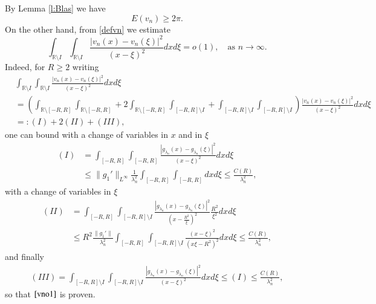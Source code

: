\documentclass[12pt, a4paper]{article}
\newcommand{\R}{\mathbb{R}}
\renewcommand{\(}{\left(}
\renewcommand{\)}{\right)}
\begin{document}
By Lemma \ref{l:Blas} we have
$$E(v_n)\ge 2\pi.$$
On the other hand, from \eqref{defvn} we estimate %
\begin{equation}\label{vno1}\int_{\R\setminus I}\int_{\R\setminus I}\frac{|v_n(x)-v_n(\xi)|^2}{(x-\xi)^2}dxd\xi=o(1),\quad \text{as }n\to\infty.
\end{equation} Indeed, for $R\geq 2$ writing \begin{align*}  & \int_{\R\setminus I}\int_{\R\setminus I}\frac{|v_n(x)-v_n(\xi)|^2}{(x-\xi)^2}dxd\xi\\&=\left(\int_{\R\setminus [-R,R]}\int_{\R\setminus [-R,R]}+2\int_{\R\setminus [-R,R]}\int_{[-R,R]\setminus I}+\int_{[-R,R]\setminus I}\int_{[-R,R]\setminus I}  \right)\frac{|v_n(x)-v_n(\xi)|^2}{(x-\xi)^2}dxd\xi\\&=:(I)+2(II)+(III),\end{align*} one can bound with a change of variables in $x$ and in $\xi$
\begin{align*}(I)&=\int_{[-R,R]}\int_{[-R,R]} \frac{|g_{\lambda_n}(x)-g_{\lambda_n}(\xi)|^2}{(x-\xi)^2}dxd\xi\\
&\leq \|g_1'\|_{L^\infty}\frac{1}{\lambda_n^2} \int_{[-R,R]}\int_{[-R,R]}dxd\xi\leq\frac{C(R)}{\lambda_n^2}, \end{align*}
with a change of variables in $\xi$  \begin{align*} (II)&= \int_{[-R,R]}\int_{[-R,R]\setminus I}\frac{|g_{\lambda_n}(x)-g_{\lambda_n}(\xi)|^2}{(x-\frac{R^2}{\xi})^2}\frac{R^2}{\xi^2}dxd\xi \\&\leq R^2 \frac{\|g_1'\|}{\lambda_n^2}\int_{[-R,R]}\int_{[-R,R]\setminus I}\frac{( x-\xi)^2}{(x\xi- R^2)^2} dxd\xi \leq \frac{C(R)}{\lambda_n^2}, \end{align*}
and finally
\begin{align*} (III)=\int_{[-R,R]\setminus I}\int_{[-R,R]\setminus I} \frac{|g_{\lambda_n}(x)-g_{\lambda_n}(\xi)|^2}{(x-\xi)^2}dxd\xi\leq (I)\leq  \frac{C(R)}{\lambda_n^2}, \end{align*}
so that $\eqref{vno1}$ is proven.
\end{document}
